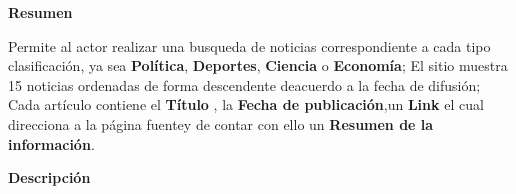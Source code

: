 
\begin{large}
	\textbf{Resumen}\\
\end{large}

Permite al actor realizar una busqueda de noticias correspondiente a cada tipo clasificación, ya sea \textbf{Política}, \textbf{Deportes}, \textbf{Ciencia} o \textbf{Economía}; El sitio muestra 15 noticias ordenadas de forma descendente deacuerdo a la fecha de difusión; Cada artículo contiene el \textbf{Título} , la \textbf{Fecha de publicación},un \textbf{Link} el cual direcciona a la página fuentey de contar con ello  un \textbf{Resumen de la información}.\\

\begin{large}
\textbf{Descripción}\\
\end{large}

